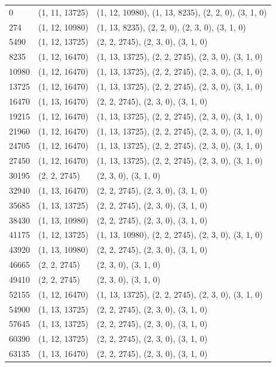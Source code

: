 \documentclass[msc,oneside]{ubcthesis}
\begin{document}
\begin{center}
\begin{longtable}{|l|l|l|}
    0 & (1, 11, 13725) & (1, 12, 10980), (1, 13, 8235), (2, 2, 0), (3, 1, 0) \\
    274 & (1, 12, 10980) & (1, 13, 8235), (2, 2, 0), (2, 3, 0), (3, 1, 0) \\
    5490 & (1, 12, 13725) & (2, 2, 2745), (2, 3, 0), (3, 1, 0) \\
    8235 & (1, 12, 16470) & (1, 13, 13725), (2, 2, 2745), (2, 3, 0), (3, 1, 0) \\
    10980 & (1, 12, 16470) & (1, 13, 13725), (2, 2, 2745), (2, 3, 0), (3, 1, 0) \\
    13725 & (1, 12, 16470) & (1, 13, 13725), (2, 2, 2745), (2, 3, 0), (3, 1, 0) \\
    16470 & (1, 13, 16470) & (2, 2, 2745), (2, 3, 0), (3, 1, 0) \\
    19215 & (1, 12, 16470) & (1, 13, 13725), (2, 2, 2745), (2, 3, 0), (3, 1, 0) \\
    21960 & (1, 12, 16470) & (1, 13, 13725), (2, 2, 2745), (2, 3, 0), (3, 1, 0) \\
    24705 & (1, 12, 16470) & (1, 13, 13725), (2, 2, 2745), (2, 3, 0), (3, 1, 0) \\
    27450 & (1, 12, 16470) & (1, 13, 13725), (2, 2, 2745), (2, 3, 0), (3, 1, 0) \\
    30195 & (2, 2, 2745) & (2, 3, 0), (3, 1, 0) \\
    32940 & (1, 13, 16470) & (2, 2, 2745), (2, 3, 0), (3, 1, 0) \\
    35685 & (1, 13, 13725) & (2, 2, 2745), (2, 3, 0), (3, 1, 0) \\
    38430 & (1, 13, 10980) & (2, 2, 2745), (2, 3, 0), (3, 1, 0) \\
    41175 & (1, 12, 13725) & (1, 13, 10980), (2, 2, 2745), (2, 3, 0), (3, 1, 0) \\
    43920 & (1, 13, 10980) & (2, 2, 2745), (2, 3, 0), (3, 1, 0) \\
    46665 & (2, 2, 2745) & (2, 3, 0), (3, 1, 0) \\
    49410 & (2, 2, 2745) & (2, 3, 0), (3, 1, 0) \\
    52155 & (1, 12, 16470) & (1, 13, 13725), (2, 2, 2745), (2, 3, 0), (3, 1, 0) \\
    54900 & (1, 13, 13725) & (2, 2, 2745), (2, 3, 0), (3, 1, 0) \\
    57645 & (1, 13, 13725) & (2, 2, 2745), (2, 3, 0), (3, 1, 0) \\
    60390 & (1, 12, 13725) & (2, 2, 2745), (2, 3, 0), (3, 1, 0) \\
    63135 & (1, 13, 16470) & (2, 2, 2745), (2, 3, 0), (3, 1, 0) \\

\end{longtable}
\end{center}
\end{document}
